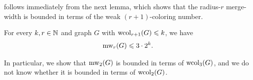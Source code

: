 







 follows immediately from the next lemma,
which 
shows that the 
 radius-$r$ merge-width 
is bounded in terms of the weak $(r+1)$-coloring number. 


\begin{lemma}\label{lem:wcol}
  For every $k,r\in\mathbb N$ and graph $G$ with $\operatorname{wcol}_{r+1}(G)\leqslant k$, we have
  $$\operatorname{mw}_r(G)\leqslant 3\cdot 2^{k} .$$
\end{lemma}
In particular, we show that $\operatorname{mw}_2(G)$  is bounded in terms of $\operatorname{wcol}_3(G)$,
and we do not know whether it is bounded in terms of $\operatorname{wcol}_2(G)$.

